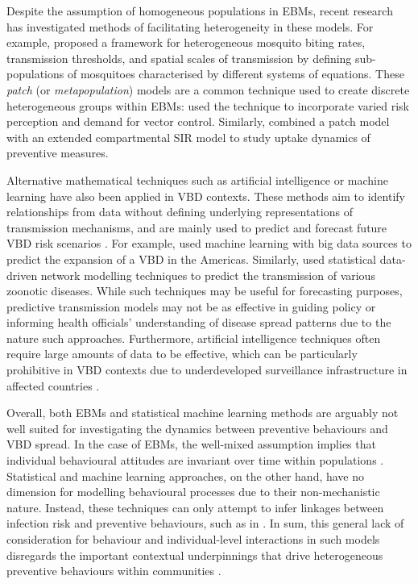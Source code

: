 Despite the assumption of homogeneous populations in EBMs, recent research has investigated methods of facilitating heterogeneity in these models. For example, \citet{perkins_heterogeneity_2013} proposed a framework for heterogeneous mosquito biting rates, transmission thresholds, and spatial scales of transmission by defining sub-populations of mosquitoes characterised by different systems of equations. These \textit{patch} (or \textit{metapopulation}) models are a common technique used to create discrete heterogeneous groups within EBMs: \citet{suarez_generic_2020} used the technique to incorporate varied risk perception and demand for vector control. Similarly, \citet{roosa_general_2022} combined a patch model with an extended compartmental SIR model to study uptake dynamics of preventive measures.

Alternative mathematical techniques such as artificial intelligence or machine learning have also been applied in VBD contexts. These methods aim to identify relationships from data without defining underlying representations of transmission mechanisms, and are mainly used to predict and forecast future VBD risk scenarios \cite{judson_modeling_2024}. For example, \citet{peters_big_2020} used machine learning with big data sources to predict the expansion of a VBD in the Americas. Similarly, \citet{pandit_predicting_2022} used statistical data-driven network modelling techniques to predict the transmission of various zoonotic diseases. While such techniques may be useful for forecasting purposes, predictive transmission models may not be as effective in guiding policy or informing health officials' understanding of disease spread patterns due to the  nature such approaches. Furthermore, artificial intelligence techniques often require large amounts of data to be effective, which can be particularly prohibitive in VBD contexts due to underdeveloped surveillance infrastructure in affected countries \cite{okumu_what_2022}.

Overall, both EBMs and statistical machine learning methods are arguably not well suited for investigating the dynamics between preventive behaviours and VBD spread. In the case of EBMs, the well-mixed assumption implies that individual behavioural attitudes are invariant over time within populations \cite{bedson_review_2021}. Statistical and machine learning approaches, on the other hand, have no dimension for modelling behavioural processes due to their non-mechanistic nature. Instead, these techniques can only attempt to infer linkages between infection risk and preventive behaviours, such as in \citet{aerts_understanding_2020}. In sum, this general lack of consideration for behaviour and individual-level interactions in such models disregards the important contextual underpinnings that drive heterogeneous preventive behaviours within communities \cite{bedson_review_2021}.

